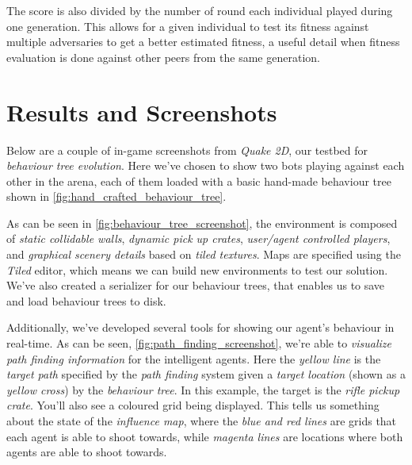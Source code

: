 \documentclass[a4paper, twocolumn]{article}
\begin{document}
        The score is also divided by the number of round each individual played during one generation. This allows for a given individual to test its fitness against multiple adversaries to get a better estimated fitness, a useful detail when fitness evaluation is done against other peers from the same generation.

    \section{Results and Screenshots} \label{sec:results_and_screenshots}

        Below are a couple of in-game screenshots from \emph{Quake 2D}, our testbed for \emph{behaviour tree evolution}. Here we've chosen to show two bots playing against each other in the arena, each of them loaded with a basic hand-made behaviour tree shown in \cref{fig:hand_crafted_behaviour_tree}.

        As can be seen in \cref{fig:behaviour_tree_screenshot}, the environment is composed of \emph{static collidable walls}, \emph{dynamic pick up crates}, \emph{user/agent controlled players}, and \emph{graphical scenery details} based on \emph{tiled textures}. Maps are specified using the \emph{Tiled} editor, which means we can build new environments to test our solution. We've also created a serializer for our behaviour trees, that enables us to save and load behaviour trees to disk.

        Additionally, we've developed several tools for showing our agent's behaviour in real-time. As can be seen, \cref{fig:path_finding_screenshot}, we're able to \emph{visualize path finding information} for the intelligent agents. Here the \emph{yellow line} is the \emph{target path} specified by the \emph{path finding} system given a \emph{target location} (shown as a \emph{yellow cross}) by the \emph{behaviour tree}. In this example, the target is the \emph{rifle pickup crate}. You'll also see a coloured grid being displayed. This tells us something about the state of the \emph{influence map}, where the \emph{blue and red lines} are grids that each agent is able to shoot towards, while \emph{magenta lines} are locations where both agents are able to shoot towards.
\end{document}
